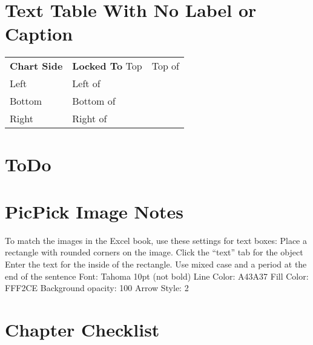 \begin{enumerate}[resume]
\section{Text Table With No Label or Caption}
\begin{table}[H]
	\captionsetup{labelformat=empty} %
	{\small
		\begin{longtable}{R{0.75in}L{1.50in}} %
			\textbf{Chart Side} & \textbf{Locked To} \endhead
			\hline
			Top & Top of \\
			Left & Left of \\
			Bottom & Bottom of \\
			Right & Right of \\
		\end{longtable}
	} %
\end{table}


\section{ToDo}

\section{PicPick Image Notes}
To match the images in the Excel book, use these settings for text boxes:
Place a rectangle with rounded corners on the image.
Click the ``text'' tab for the object
Enter the text for the inside of the rectangle. Use mixed case and a period at the end of the sentence
Font: Tahoma 10pt (not bold)
Line Color: A43A37
Fill Color: FFF2CE
Background opacity: 100%
Arrow Style: 2


\section{Chapter Checklist}


\end{enumerate}

